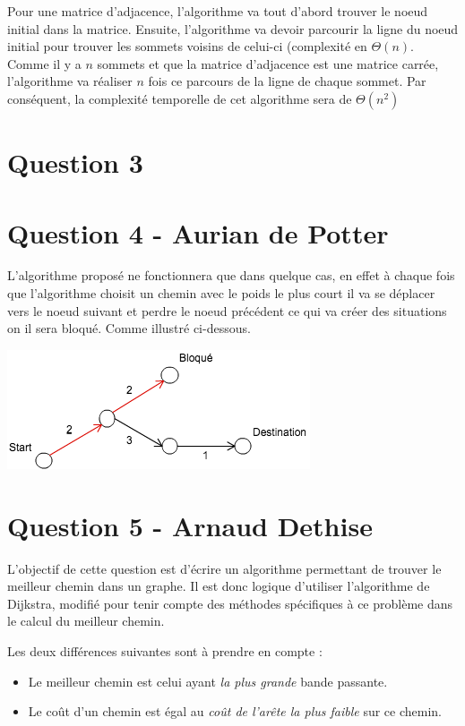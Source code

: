 \documentclass[10pt,a4paper]{article}
\begin{document}
Pour une matrice d'adjacence, l'algorithme va tout d'abord trouver le noeud initial dans la matrice. Ensuite, l'algorithme va devoir parcourir la ligne du noeud initial pour trouver les sommets voisins de celui-ci (complexité en $\Theta(n)$. Comme il y a $n$ sommets et que la matrice d'adjacence est une matrice carrée, l'algorithme va réaliser $n$ fois ce parcours de la ligne de chaque sommet. Par conséquent, la complexité temporelle de cet algorithme sera de $\Theta(n^{2})$

\section*{Question 3}
\section*{Question 4 - Aurian de Potter}
L'algorithme proposé ne fonctionnera que dans quelque cas, en effet à chaque fois que l'algorithme choisit un chemin avec le poids le plus court il va se déplacer vers le noeud suivant et perdre le noeud précédent ce qui va créer des situations on il sera bloqué. Comme illustré ci-dessous.

\begin{center}
    \includegraphics[scale=0.7]{ex.png}
\end{center}

\section*{Question 5 - Arnaud Dethise}

	L'objectif de cette question est d'écrire un algorithme permettant de trouver le meilleur chemin dans un graphe. 
	Il est donc logique d'utiliser l'algorithme de Dijkstra, modifié pour tenir compte des méthodes spécifiques à ce problème dans le calcul du meilleur chemin.
	
	Les deux différences suivantes sont à prendre en compte :
	\begin{itemize}
	\item Le meilleur chemin est celui ayant \textit{la plus grande} bande passante.
	\item Le coût d'un chemin est égal au \textit{coût de l'arête la plus faible} sur ce chemin.
	\end{itemize}
	
\end{document}
